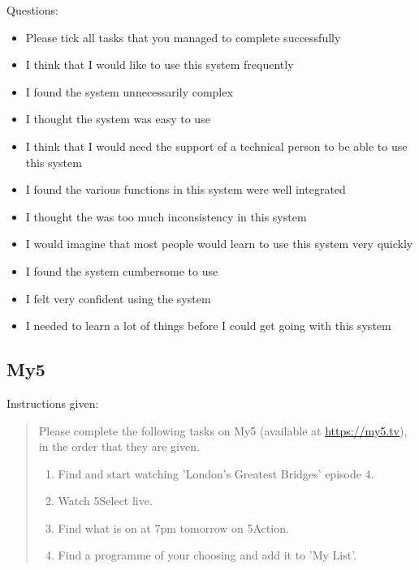 \documentclass[12pt,a4paper,x11names]{article}
\begin{document}
\noindent{}Questions:
\begin{itemize}
\item Please tick all tasks that you managed to complete successfully
\item I think that I would like to use this system frequently
\item I found the system unnecessarily complex
\item I thought the system was easy to use
\item I think that I would need the support of a technical person to be able to use this system
\item I found the various functions in this system were well integrated
\item I thought the was too much inconsistency in this system
\item I would imagine that most people would learn to use this system very quickly
\item I found the system cumbersome to use
\item I felt very confident using the system
\item I needed to learn a lot of things before I could get going with this system
\end{itemize}

\subsection{My5}
Instructions given:
\begin{quote}
Please complete the following tasks on My5 (available at \url{https://my5.tv}), in the order that they are given.

\begin{enumerate}
\item Find and start watching 'London's Greatest Bridges' episode 4.
\item Watch 5Select live.
\item Find what is on at 7pm tomorrow on 5Action.
\item Find a programme of your choosing and add it to 'My List'.
\end{enumerate}
\end{quote}
\end{document}
